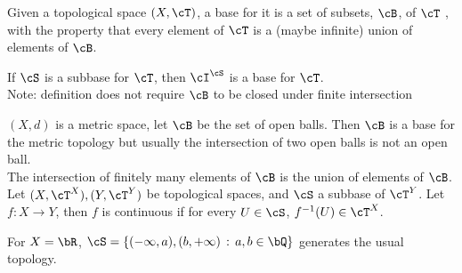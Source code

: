\begin{definition}
    Given a topological space $(X, \cT)$, a base for it is a set of subsets, $\cB$, of $\cT$ , with the property that every element of $\cT$ is a (maybe infinite) union of elements of $\cB$. 
\end{definition}

\noindent
If $\cS$ is a subbase for $\cT$, then $\cI^{\cS}$ is a base for $\cT$. \\
Note: definition does not require $\cB$ to be closed under finite intersection 

\noindent 
$(X,d)$ is a metric space, let $\cB$ be the set of open balls. Then $\cB$ is a base for the metric topology but usually the intersection of two open balls is not an open ball. \\
The intersection of finitely many elements of $\cB$ is the union of elements of $\cB$. \\

\noindent
Let $(X, \cT^X), (Y, \cT^Y)$ be topological spaces, and $\cS$ a subbase of $\cT^Y$. Let $f: X \to Y$, then $f$ is continuous if for every $U \in \cS$, $f^{-1}(U) \in \cT^X$. 

\begin{example}
    For $X = \bR$, $\cS = \{ (-\infty, a), (b, +\infty) \, : \, a, b\in \bQ\}$ generates the usual topology. 
\end{example}